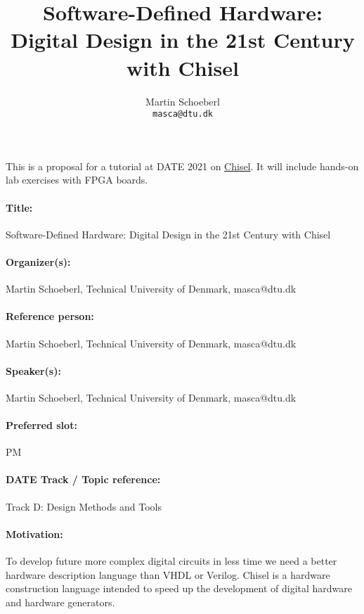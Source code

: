 \documentclass{article}
\begin{document}
\title{Software-Defined Hardware:\\ Digital Design in the 21st Century with Chisel}

\author{Martin Schoeberl\\
\texttt{masca@dtu.dk}}


\maketitle \thispagestyle{empty}

This is a proposal for a tutorial at DATE 2021 on \href{https://chisel.eecs.berkeley.edu/}{Chisel}.
It will include hands-on lab exercises with FPGA boards.


\paragraph{Title:} Software-Defined Hardware: Digital Design in the 21st Century with Chisel
\paragraph{Organizer(s):} Martin Schoeberl, Technical University of Denmark, masca@dtu.dk
\paragraph{Reference person:} Martin Schoeberl, Technical University of Denmark, masca@dtu.dk
\paragraph{Speaker(s):} Martin Schoeberl, Technical University of Denmark, masca@dtu.dk
\paragraph{Preferred slot:} PM
\paragraph{DATE Track / Topic reference:} Track D: Design Methods and Tools

\paragraph{Motivation:}

To develop future more complex digital circuits in less time we need a better hardware description
language than VHDL or Verilog. Chisel is a hardware construction language intended to
speed up the development of digital hardware and hardware generators.
\end{document}
